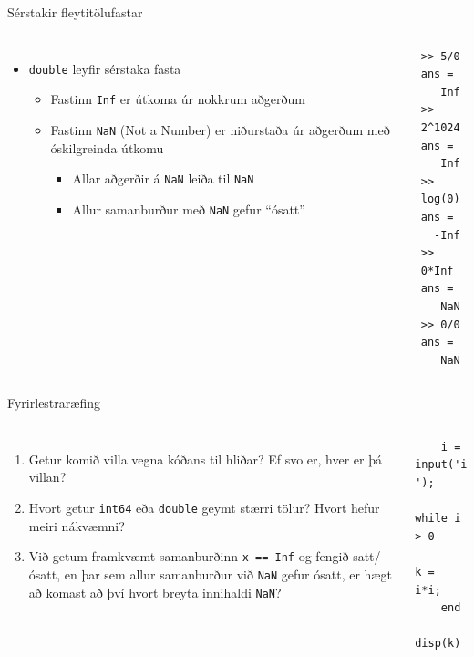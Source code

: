 \documentclass{beamer}
\begin{document}
\begin{frame}[fragile]{Sérstakir fleytitölufastar}
\begin{columns}
\begin{itemize}
 \item \texttt{double} leyfir sérstaka fasta
 \begin{itemize}
  \item Fastinn \texttt{Inf} er útkoma úr nokkrum aðgerðum
  \item Fastinn \texttt{NaN} (Not a Number) er niðurstaða úr aðgerðum með óskilgreinda útkomu
  \begin{itemize}
   \item Allar aðgerðir á \texttt{NaN} leiða til \texttt{NaN}
   \item Allur samanburður með \texttt{NaN} gefur ``ósatt''
  \end{itemize}
 \end{itemize}
\end{itemize}
\begin{verbatim}
>> 5/0
ans =
   Inf
>> 2^1024
ans =
   Inf
>> log(0)
ans =
  -Inf
>> 0*Inf
ans =
   NaN
>> 0/0
ans =
   NaN
\end{verbatim}
\end{columns}
\end{frame}

\begin{frame}[fragile]{Fyrirlestraræfing}
    \begin{columns}
    \begin{enumerate}
     \item Getur komið villa vegna kóðans til hliðar? Ef svo er, hver er þá villan?
     \item Hvort getur \texttt{int64} eða \texttt{double} geymt stærri tölur? Hvort hefur meiri nákvæmni?
     \item Við getum framkvæmt samanburðinn \texttt{x == Inf} og fengið satt/ósatt, en þar sem allur samanburður við \texttt{NaN} gefur ósatt, er hægt að komast að því hvort breyta innihaldi \texttt{NaN}?
    \end{enumerate}
    \begin{verbatim}
    i = input('i: ');
    while i > 0
        k = i*i;
    end
    disp(k)
    \end{verbatim}
    
    \end{columns}
\end{frame}
\end{document}
